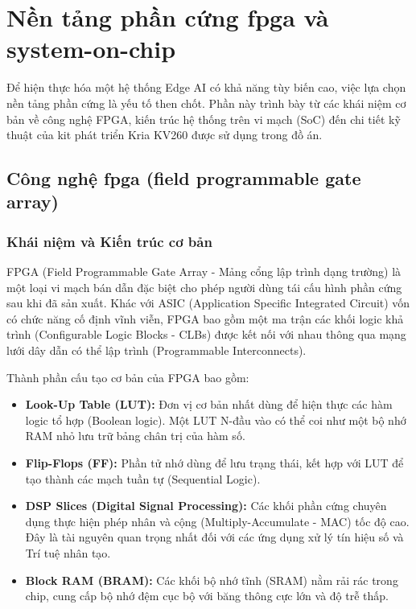\newpage
\section{Nền tảng phần cứng fpga và system-on-chip}

Để hiện thực hóa một hệ thống Edge AI có khả năng tùy biến cao, 
việc lựa chọn nền tảng phần cứng là yếu tố then chốt. 
Phần này trình bày từ các khái niệm cơ bản về công nghệ FPGA, 
kiến trúc hệ thống trên vi mạch (SoC) đến chi tiết kỹ thuật của 
kit phát triển Kria KV260 được sử dụng trong đồ án.

\subsection{Công nghệ fpga (field programmable gate array)}
\subsubsection{Khái niệm và Kiến trúc cơ bản}
FPGA (Field Programmable Gate Array - Mảng cổng lập trình dạng trường) 
là một loại vi mạch bán dẫn đặc biệt cho phép người dùng tái cấu hình 
phần cứng sau khi đã sản xuất. Khác với ASIC (Application Specific Integrated Circuit) 
vốn có chức năng cố định vĩnh viễn, 
FPGA bao gồm một ma trận các khối logic khả trình (Configurable Logic Blocks - CLBs) 
được kết nối với nhau thông qua mạng lưới dây dẫn có thể lập trình 
(Programmable Interconnects).\cite{fpga1}

Thành phần cấu tạo cơ bản của FPGA bao gồm:
\begin{itemize}
    \item \textbf{Look-Up Table (LUT):} Đơn vị cơ bản nhất dùng để hiện thực các hàm logic tổ hợp (Boolean logic). Một LUT N-đầu vào có thể coi như một bộ nhớ RAM nhỏ lưu trữ bảng chân trị của hàm số.
    \item \textbf{Flip-Flops (FF):} Phần tử nhớ dùng để lưu trạng thái, kết hợp với LUT để tạo thành các mạch tuần tự (Sequential Logic).
    \item \textbf{DSP Slices (Digital Signal Processing):} Các khối phần cứng chuyên dụng thực hiện phép nhân và cộng (Multiply-Accumulate - MAC) tốc độ cao. Đây là tài nguyên quan trọng nhất đối với các ứng dụng xử lý tín hiệu số và Trí tuệ nhân tạo.
    \item \textbf{Block RAM (BRAM):} Các khối bộ nhớ tĩnh (SRAM) nằm rải rác trong chip, cung cấp bộ nhớ đệm cục bộ với băng thông cực lớn và độ trễ thấp.
\end{itemize}

